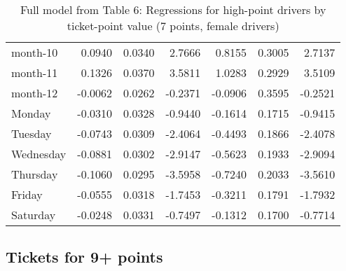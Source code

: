 \documentclass[10pt]{article}
\begin{document}
\begin{table}[ht]
\begin{tabular}{lrrrrrr}
  month-10 & 0.0940 & 0.0340 & 2.7666 & 0.8155 & 0.3005 & 2.7137 \\ 
  month-11 & 0.1326 & 0.0370 & 3.5811 & 1.0283 & 0.2929 & 3.5109 \\ 
  month-12 & -0.0062 & 0.0262 & -0.2371 & -0.0906 & 0.3595 & -0.2521 \\ 
  Monday & -0.0310 & 0.0328 & -0.9440 & -0.1614 & 0.1715 & -0.9415 \\ 
  Tuesday & -0.0743 & 0.0309 & -2.4064 & -0.4493 & 0.1866 & -2.4078 \\ 
  Wednesday & -0.0881 & 0.0302 & -2.9147 & -0.5623 & 0.1933 & -2.9094 \\ 
  Thursday & -0.1060 & 0.0295 & -3.5958 & -0.7240 & 0.2033 & -3.5610 \\ 
  Friday & -0.0555 & 0.0318 & -1.7453 & -0.3211 & 0.1791 & -1.7932 \\ 
  Saturday & -0.0248 & 0.0331 & -0.7497 & -0.1312 & 0.1700 & -0.7714 \\ 
   \hline
\end{tabular}
\caption{Full model from Table 6: Regressions for high-point drivers by ticket-point value (7 points, female drivers)} 
\label{tab_6_7_pts_no_age_F}
\end{table}


\clearpage
\pagebreak




\subsection{Tickets for 9+ points}



\end{document}
